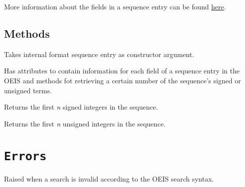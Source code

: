 \documentclass[letterpaper,10pt,english]{sphinxmanual}
\begin{document}
More information about the fields in a sequence entry can be found \href{http://oeis.org/eishelp2.html}{here}.


\subsection{Methods}
\label{api:methods}

\begin{fulllineitems}
Takes internal format sequence entry as constructor argument.

Has attributes to contain information for each field of a
sequence entry in the OEIS and methods fot retrieving a certain
number of the sequence's signed or unsigned terms.

\begin{fulllineitems}
Returns the first \emph{n} signed integers in the sequence.

\end{fulllineitems}


\begin{fulllineitems}
Returns the first \emph{n} unsigned integers in the sequence.

\end{fulllineitems}


\end{fulllineitems}



\section{\texttt{Errors}}
\label{api:module-errors}\label{api:errors}

\begin{fulllineitems}
\label{api:errors.InvalidQueryError}
Raised when a search is invalid according to the OEIS search
syntax.

\end{fulllineitems}

\end{document}

